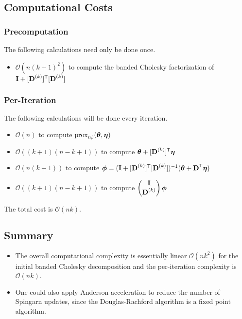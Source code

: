 \documentclass{article}
\newcommand{\Tra}{^{\sf T}} %
\newcommand{\Inv}{^{-1}} %
\newcommand{\V}[1]{{\bm{\mathbf{\MakeLowercase{#1}}}}} %
\newcommand{\M}[1]{{\bm{\mathbf{\MakeUppercase{#1}}}}} %
\newcommand{\Mn}[2]{\M{#1}^{(#2)}} %
\newcommand{\prox}[2]{\operatorname{prox}_{#1}({#2})}
\begin{document}
\subsection*{Computational Costs}

\subsubsection*{Precomputation}

The following calculations need only be done once. 

\begin{itemize}
\item $\mathcal{O}(n(k + 1)^2)$ to compute the banded Cholesky factorization of $\M{I} + [\Mn{D}{k}]\Tra[\Mn{D}{k}]$
\end{itemize}

\subsubsection*{Per-Iteration}

The following calculations will be done every iteration.

\begin{itemize}
\item $\mathcal{O}(n)$ to compute $\prox{t\psi}{\V{\theta}, \V{\eta}}$
\item $\mathcal{O}((k+1)(n-k+1))$ to compute $\V{\theta} + [\Mn{D}{k}]\Tra\V{\eta}$
\item $\mathcal{O}(n(k+1))$ to compute $\V{\phi} = (\M{I} +[\Mn{D}{k}]\Tra[\Mn{D}{k}] )\Inv(\V{\theta} + \M{D}\Tra\V{\eta})$
\item $\mathcal{O}((k+1)(n-k+1))$ to compute $\begin{pmatrix}
\M{I} \\ \Mn{D}{k} \end{pmatrix}\V{\phi}$
\end{itemize}

The total cost is $\mathcal{O}(nk)$.

\subsection{Summary}

\begin{itemize}
\item The overall computational complexity is essentially linear $\mathcal{O}(nk^2)$ for the initial banded Cholesky decomposition and the per-iteration complexity is $\mathcal{O}(nk)$.
\item One could also apply Anderson acceleration \cite{Walker2011} to reduce the number of Spingarn updates, since the Douglas-Rachford algorithm is a fixed point algorithm.
\end{itemize}
\end{document}
